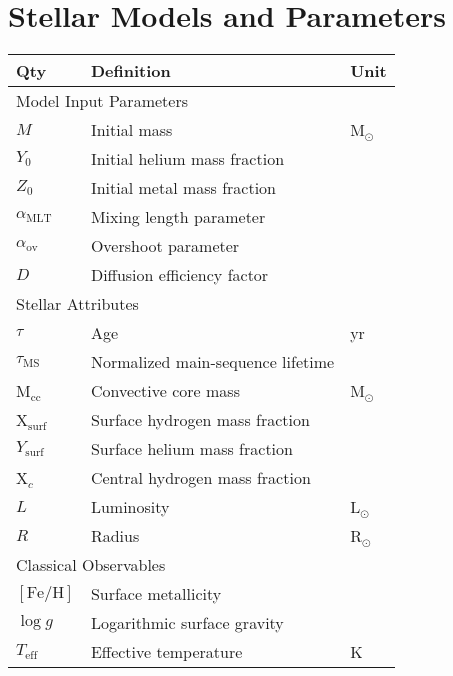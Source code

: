 \section{Stellar Models and Parameters}
\begin{table}
\centering
{
\renewcommand{\arraystretch}{1.2}
\centering
\begin{tabular}{lll} 
\hline \hline  
\textbf{Qty} & \textbf{Definition} & \textbf{Unit} \\ 
\hline
\multicolumn{3}{l}{Model Input Parameters} \\ 
$M$ & Initial mass & M$_{\odot}$ \\
$Y_0$ & Initial helium mass fraction & \\
$Z_0$ & Initial metal mass fraction & \\
$\alpha_{\text{MLT}}$ & Mixing length parameter & \\
$\alpha_{\text{ov}}$ & Overshoot parameter & \\ 
$D$ & Diffusion efficiency factor & \\[8pt] 
\multicolumn{3}{l}{Stellar Attributes} \\
$\tau$ & Age & yr \\
$\tau_{\text{MS}}$ & Normalized main-sequence lifetime &  \\
M$_{\text{cc}}$ & Convective core mass & M$_{\odot}$ \\
X$_{\text{surf}}$ & Surface hydrogen mass fraction & \\
$Y_{\text{surf}}$ & Surface helium mass fraction & \\
X$_c$ & Central hydrogen mass fraction & \\
$L$ & Luminosity & L$_{\odot}$ \\ 
$R$ & Radius & R$_{\odot}$ \\[8pt]
\multicolumn{3}{l}{Classical Observables} \\
$[\text{Fe/H}]$ & Surface metallicity & \\
$\log{} g$ & Logarithmic surface gravity &  \\ %
$T_{\text{eff}}$ & Effective temperature & K \\[8pt]


\end{tabular}}
\end{table}
